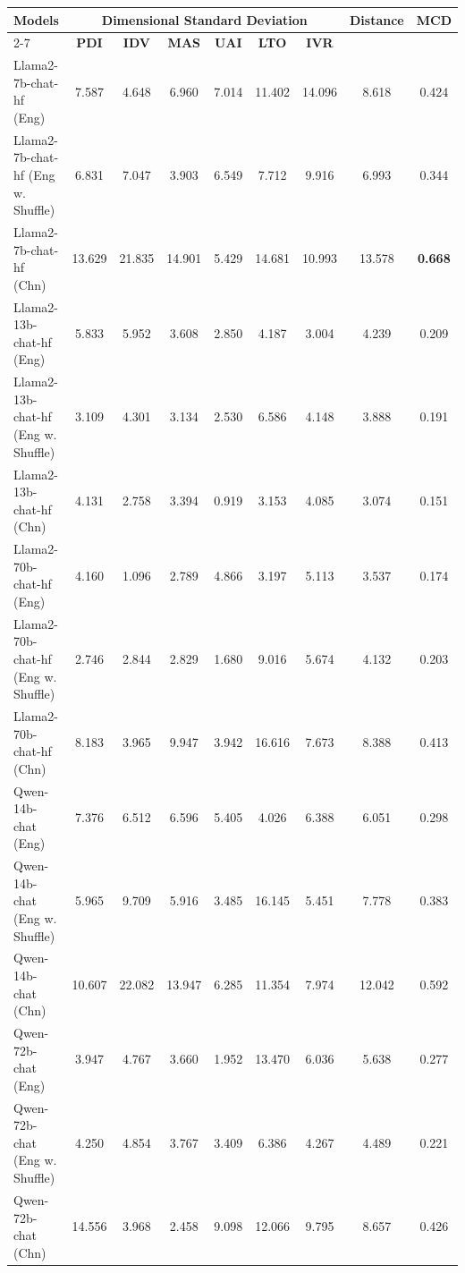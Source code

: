 \documentclass[11pt]{article}
\begin{document}
\begin{table}[hbt]
\centering
\setlength\tabcolsep{1.5pt}
\renewcommand{\arraystretch}{1.25}
\begin{tabular}{l|c|c|c|c|c|c|c|c}
\hline
\multirow{2}{*}{\textbf{Models}} & \multicolumn{6}{c|}{\textbf{Dimensional Standard Deviation}} & \multirow{2}{*}{\textbf{Distance}} & \multirow{2}{*}{\textbf{MCD}}\\
\cline{2-7}
{} & {\textbf{PDI}} & {\textbf{IDV}} & {\textbf{MAS}} & {\textbf{UAI}} & {\textbf{LTO}} & {\textbf{IVR}} & {} \\
\hline
{Llama2-7b-chat-hf (Eng) } & 7.587 & 4.648 & 6.960 & 7.014 & 11.402 & 14.096 & 8.618 & 0.424 \\
{Llama2-7b-chat-hf (Eng w. Shuffle) } & 6.831 & 7.047 & 3.903 & 6.549 & 7.712 & 9.916 & 6.993 & 0.344 \\
{Llama2-7b-chat-hf (Chn) } & 13.629 & 21.835 & 14.901 & 5.429 & 14.681 & 10.993 & 13.578 & \textbf{0.668} \\
\hline
{Llama2-13b-chat-hf (Eng) } & 5.833 & 5.952 & 3.608 & 2.850 & 4.187 & 3.004 & 4.239 & 0.209 \\
{Llama2-13b-chat-hf (Eng w. Shuffle) } & 3.109 & 4.301 & 3.134 & 2.530 & 6.586 & 4.148 & 3.888 & 0.191 \\
{Llama2-13b-chat-hf (Chn) } & 4.131 & 2.758 & 3.394 & 0.919 & 3.153 & 4.085 & 3.074 & 0.151 \\
\hline
{Llama2-70b-chat-hf (Eng) } & 4.160 & 1.096 & 2.789 & 4.866 & 3.197 & 5.113 & 3.537 & 0.174 \\
{Llama2-70b-chat-hf (Eng w. Shuffle) } & 2.746 & 2.844 & 2.829 & 1.680 & 9.016 & 5.674 & 4.132 & 0.203 \\
{Llama2-70b-chat-hf (Chn) } & 8.183 & 3.965 & 9.947 & 3.942 & 16.616 & 7.673 & 8.388 & 0.413 \\
\hline
{Qwen-14b-chat (Eng) } & 7.376 & 6.512 & 6.596 & 5.405 & 4.026 & 6.388 & 6.051 & 0.298 \\
{Qwen-14b-chat (Eng w. Shuffle) } & 5.965 & 9.709 & 5.916 & 3.485 & 16.145 & 5.451 & 7.778 & 0.383 \\
{Qwen-14b-chat (Chn) } & 10.607 & 22.082 & 13.947 & 6.285 & 11.354 & 7.974 & 12.042 & 0.592 \\
\hline
{Qwen-72b-chat (Eng) } & 3.947 & 4.767 & 3.660 & 1.952 & 13.470 & 6.036 & 5.638 & 0.277 \\
{Qwen-72b-chat (Eng w. Shuffle) } & 4.250 & 4.854 & 3.767 & 3.409 & 6.386 & 4.267 & 4.489 & 0.221 \\
{Qwen-72b-chat (Chn) } & 14.556 & 3.968 & 2.458 & 9.098 & 12.066 & 9.795 & 8.657 & 0.426 \\

\end{tabular}
\end{table}
\end{document}
